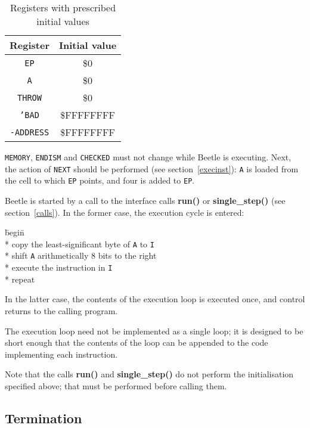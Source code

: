 \documentclass{article}
\begin{document}
\begin{table}[htbp]
\begin{center}
\begin{tabular}{cc} \toprule
\bf Register & \bf Initial value \\ \midrule
{\tt EP} & \$0 \\
{\tt A} & \$0 \\
{\tt THROW} & \$0 \\
{\tt 'BAD} & {\$FFFFFFFF} \\
{\tt -ADDRESS} & {\$FFFFFFFF} \\ \bottomrule
\end{tabular}
\caption{\label{inittable}Registers with prescribed initial values}
\end{center}
\end{table}

{\tt MEMORY}, {\tt ENDISM} and {\tt CHECKED} must not change while Beetle is executing. Next, the action of
{\tt NEXT} should be performed (see section~\ref{execinst}): {\tt A} is loaded
from the cell to which {\tt EP} points, and four is added to {\tt EP}.

Beetle is started by a call to the interface calls {\bf run()} or {\bf
single\_step()} (see section~\ref{calls}). In the former case, the execution
cycle is entered:

\begin{tabbing}
\hspace{0.5in}\=begin\=\+\+ \\*
copy the least-significant byte of {\tt A} to {\tt I} \\*
shift {\tt A} arithmetically 8 bits to the right \\*
execute the instruction in {\tt I} \- \\*
repeat
\end{tabbing}

In the latter case, the contents of the execution loop is executed once, and
control returns to the calling program.

The execution loop need not be implemented as a single loop; it  is designed to
be short enough that the contents of the loop can be appended  to the code
implementing each instruction.

Note that the calls {\bf run()} and {\bf single\_step()} do not perform the
initialisation specified above; that must be performed before calling them.


\subsection{Termination}
\end{document}
